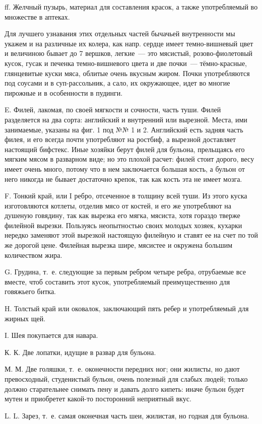 ff. Желчный пузырь, материал для составления красок, а также употребляемый во множестве в аптеках.

Для лучшего узнавания этих отдельных частей бычачьей внутренности мы укажем и на различные их колера, как напр. сердце имеет темно-вишневый цвет и величиною бывает до 7 вершков, легкие~--- это мясистый, розово-фиолетовый кусок, гусак и печенка темно-вишневого цвета и две почки~--- тёмно-красные, глянцевитые куски мяса, облитые очень вкусным жиром. Почки употребляются под соусами и в суп-рассольник, а сало, их окружающее, идет во многие пирожные и в особенности в пудинги.

E. Филей, лакомая, по своей мягкости и сочности, часть туши. Филей разделяется на два сорта: английский и внутренний или вырезной. Места, ими занимаемые, указаны на фиг. 1 под №№ 1 и 2. Английский есть задняя часть филея, и его всегда почти употребляют на ростбиф, а вырезной доставляет настоящий бифстекс. Иные хозяйки берут филей для бульона, прельщаясь его мягким мясом в разварном виде; но это плохой расчет: филей стоит дорого, весу имеет очень много, потому что в нем заключается большая кость, а бульон от него никогда не бывает достаточно крепок, так как кость эта не имеет мозга.

F. Тонкий край, или I ребро, отсеченное в толщину всей туши. Из этого куска изготовляются котлеты, отделив мясо от костей, и его же употребляют на душеную говядину, так как вырезка его мягка, мясиста, хотя гораздо тверже филейной вырезки. Пользуясь неопытностью своих молодых хозяек, кухарки нередко заменяют этой вырезкой настоящую филейную и ставят ее на счет по той же дорогой цене. Филейная вырезка шире, мясистее и окружена большим количеством жира.

G. Грудина, т.~е. следующие за первым ребром четыре ребра, отрубаемые все вместе, чтоб составить этот кусок, употребляемый преимущественно для говяжьего битка.

H. Толстый край или оковалок, заключающий пять ребер и употребляемый для жирных щей.

I. Шея покупается для навара.

К. К. Две лопатки, идущие в развар для бульона.

М. М. Две голяшки, т.~е. оконечности передних ног; они жилисты, но дают превосходный, студенистый бульон, очень полезный для слабых людей; только должно старательнее снимать пену и давать долго кипеть: иначе бульон будет мутен и приобретет какой-то посторонний неприятный вкус.

L. L. Зарез, т.~е. самая оконечная часть шеи, жилистая, но годная для бульона.

